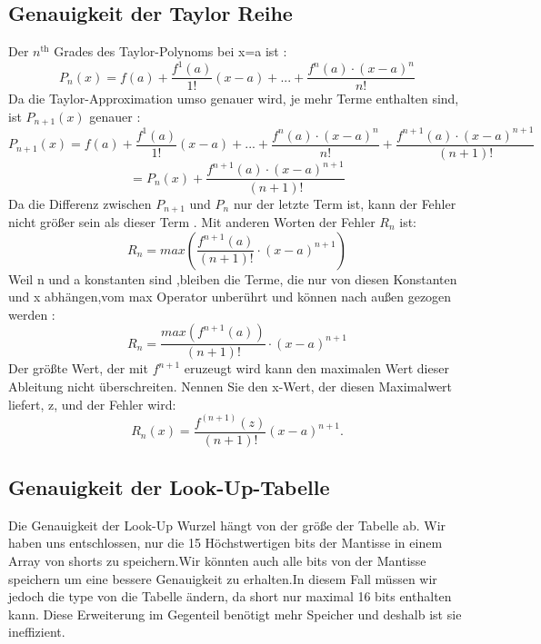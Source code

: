 \documentclass[course=erap]{aspdoc}
\begin{document}
\subsection{Genauigkeit der Taylor Reihe}
Der $n^\text{th}$  Grades des Taylor-Polynoms bei x=a ist \cite{errortaylor}:
\begin{equation} \label{eq17}
    P_{n}(x)=f(a)+\frac{f^{1}(a)}{1!}(x-a)+...+\frac{f^{n}(a)\cdot (x-a)^{n}}{n!}
\end{equation}
Da die Taylor-Approximation umso genauer wird, je mehr Terme enthalten sind, ist $P_{n+1}(x)$
genauer :
\begin{equation} \label{eq18}
    P_{n+1}(x)=f(a)+\frac{f^{1}(a)}{1!}(x-a)+...+\frac{f^{n}(a)\cdot(x-a)^{n}}{n!}+\frac{f^{n+1}(a)\cdot (x-a)^{n+1}}{(n+1)!}
\end{equation}
\begin{equation}
    =P_{n}(x)+\frac{f^{n+1}(a)\cdot (x-a)^{n+1}}{(n+1)!}
\end{equation}
Da die Differenz zwischen $P_{n+1}$ und $P_{n}$ nur der letzte Term ist, kann der Fehler nicht größer sein als dieser Term . Mit anderen Worten  der Fehler $R_{n}$ ist:
\begin{equation} \label{eq19}
    R_{n}=max(\frac{f^{n+1}(a)}{(n+1)!} \cdot (x-a)^{n+1})
\end{equation}
Weil n und a konstanten sind ,bleiben die Terme, die nur von diesen Konstanten und x abhängen,vom max Operator unberührt und können nach außen gezogen werden :
\begin{equation} \label{eq20}
    R_{n}=\frac{max(f^{n+1}(a))}{(n+1)!} \cdot (x-a)^{n+1}
\end{equation}
Der größte Wert, der mit $f^{n+1}$ eruzeugt wird kann den maximalen Wert dieser Ableitung nicht überschreiten.
Nennen Sie den x-Wert, der diesen Maximalwert liefert, z, und der Fehler wird:
\begin{equation} \label{eq21}
    R_n(x)=\frac{f^{(n+1)}(z)}{(n+1)!}(x-a)^{n+1}.
\end{equation}

\subsection{Genauigkeit der Look-Up-Tabelle}
Die Genauigkeit der Look-Up Wurzel hängt von der größe der Tabelle ab. Wir haben uns entschlossen, nur  die  15 Höchstwertigen bits
der Mantisse in einem Array von shorts zu speichern.Wir könnten auch alle bits von der Mantisse speichern um eine bessere Genauigkeit
zu erhalten.In diesem Fall müssen wir jedoch die type von die Tabelle ändern, da short nur maximal 16 bits enthalten kann.
Diese Erweiterung im Gegenteil benötigt mehr Speicher und deshalb ist sie ineffizient.
\end{document}
